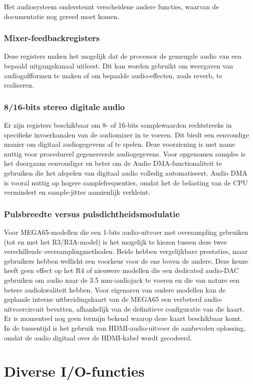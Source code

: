 Het audiosysteem ondersteunt verscheidene andere functies, waarvan de documentatie nog gereed moet komen.

\subsubsection{Mixer-feedbackregisters}

Deze registers maken het mogelijk dat de processor de gemengde audio van een bepaald uitgangskanaal uitleest. Dit kan worden gebruikt om weergaven van audiogolfformen te maken of om bepaalde audio-effecten, zoals reverb, te realiseren.

\subsubsection{8/16-bits stereo digitale audio}

Er zijn registers beschikbaar om 8- of 16-bits samplewaarden rechtstreeks in specifieke invoerkanalen van de audiomixer in te voeren. Dit biedt een eenvoudige manier om digitaal audiogegevens af te spelen. Deze voorziening is met name nuttig voor procedureel gegenereerde audiogegevens. Voor opgenomen samples is het doorgaans eenvoudiger en beter om de Audio DMA-functionaliteit te gebruiken die het afspelen van digitaal audio volledig automatiseert. Audio DMA is vooral nuttig op hogere samplefrequenties, omdat het de belasting van de CPU vermindert en sample-jitter aanzienlijk verkleint.

\subsubsection{Pulsbreedte versus pulsdichtheidsmodulatie}

Voor MEGA65-modellen die een 1-bits audio-uitvoer met oversampling gebruiken (tot en met het R3/R3A-model) is het mogelijk te kiezen tussen deze twee verschillende oversamplingmethoden. Beide hebben vergelijkbare prestaties, maar gebruikers hebben wellicht een voorkeur voor de ene boven de andere. Deze keuze heeft geen effect op het R4 of nieuwere modellen die een dedicated audio-DAC gebruiken om audio naar de 3.5 mm-audiojack te voeren en die van nature een betere audiokwaliteit hebben. Voor eigenaren van oudere modellen kan de geplande interne uitbreidingskaart van de MEGA65 een verbeterd audio-uitvoercircuit bevatten, afhankelijk van de definitieve configuratie van die kaart. Er is momenteel nog geen termijn bekend waarop deze kaart beschikbaar komt. In de tussentijd is het gebruik van HDMI-audio-uitvoer de aanbevolen oplossing, omdat de audio digitaal over de HDMI-kabel wordt gecodeerd.




\section{Diverse I/O-functies}

